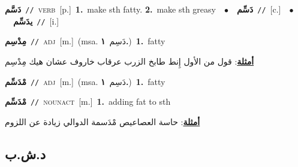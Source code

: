 \documentclass[10pt,a4paper,twoside]{article} %
\begin{document}
\begin{multicols}{2}
{\setlength\topsep{0pt}\textbf{\foreignlanguage{arabic}{دَسَّم}}\ {\color{gray}\texttt{//}\color{black}}\ \textsc{verb}\ [p.]\ \textbf{1.}~make sth fatty.  \textbf{2.}~make sth greasy\ \ $\bullet$\ \ \setlength\topsep{0pt}\textbf{\foreignlanguage{arabic}{دَسِّم}}\ {\color{gray}\texttt{//}\color{black}}\ [c.]\ \ $\bullet$\ \ \setlength\topsep{0pt}\textbf{\foreignlanguage{arabic}{يدَسِّم}}\ {\color{gray}\texttt{//}\color{black}}\ [i.]\ } \vspace{2mm}

{\setlength\topsep{0pt}\textbf{\foreignlanguage{arabic}{مِدْسِم}}\ {\color{gray}\texttt{//}\color{black}}\ \textsc{adj}\ [m.]\ \color{gray}(msa. \foreignlanguage{arabic}{دَسِم}~\foreignlanguage{arabic}{\textbf{١.}})\color{black}\ \textbf{1.}~fatty\  \begin{flushright}\color{gray}\foreignlanguage{arabic}{\textbf{\underline{\foreignlanguage{arabic}{أمثلة}}}: قول من الأول إِنط طابخ الزرب عرقاب خاروف عشان هيك مِدْسِم}\end{flushright}\color{black}} \vspace{2mm}

{\setlength\topsep{0pt}\textbf{\foreignlanguage{arabic}{مْدَسِّم}}\ {\color{gray}\texttt{//}\color{black}}\ \textsc{adj}\ [m.]\ \color{gray}(msa. \foreignlanguage{arabic}{دَسِم}~\foreignlanguage{arabic}{\textbf{١.}})\color{black}\ \textbf{1.}~fatty\ } \vspace{2mm}

{\setlength\topsep{0pt}\textbf{\foreignlanguage{arabic}{مْدَسِّم}}\ {\color{gray}\texttt{//}\color{black}}\ \textsc{noun\textunderscore act}\ [m.]\ \textbf{1.}~adding fat to sth\  \begin{flushright}\color{gray}\foreignlanguage{arabic}{\textbf{\underline{\foreignlanguage{arabic}{أمثلة}}}: حاسة العصاعيص مْدَسمة الدوالي زيادة عن اللزوم}\end{flushright}\color{black}} \vspace{2mm}

\vspace{-3mm}
\subsection*{\color{blue}\foreignlanguage{arabic}{د.ش.ب}\color{blue}{}} 


\end{multicols}
\end{document}
